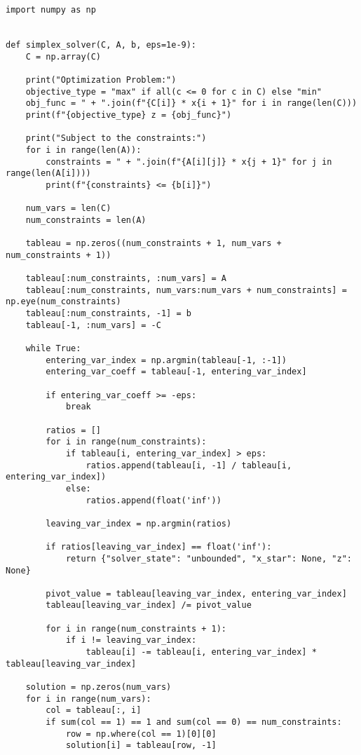 \documentclass[12pt, legalpaper]{exam}
\begin{document}
\begin{verbatim}
import numpy as np


def simplex_solver(C, A, b, eps=1e-9):
    C = np.array(C)

    print("Optimization Problem:")
    objective_type = "max" if all(c <= 0 for c in C) else "min"
    obj_func = " + ".join(f"{C[i]} * x{i + 1}" for i in range(len(C)))
    print(f"{objective_type} z = {obj_func}")

    print("Subject to the constraints:")
    for i in range(len(A)):
        constraints = " + ".join(f"{A[i][j]} * x{j + 1}" for j in range(len(A[i])))
        print(f"{constraints} <= {b[i]}")

    num_vars = len(C)
    num_constraints = len(A)

    tableau = np.zeros((num_constraints + 1, num_vars + num_constraints + 1))

    tableau[:num_constraints, :num_vars] = A
    tableau[:num_constraints, num_vars:num_vars + num_constraints] = np.eye(num_constraints)
    tableau[:num_constraints, -1] = b
    tableau[-1, :num_vars] = -C

    while True:
        entering_var_index = np.argmin(tableau[-1, :-1])
        entering_var_coeff = tableau[-1, entering_var_index]

        if entering_var_coeff >= -eps:
            break

        ratios = []
        for i in range(num_constraints):
            if tableau[i, entering_var_index] > eps:
                ratios.append(tableau[i, -1] / tableau[i, entering_var_index])
            else:
                ratios.append(float('inf'))

        leaving_var_index = np.argmin(ratios)

        if ratios[leaving_var_index] == float('inf'):
            return {"solver_state": "unbounded", "x_star": None, "z": None}

        pivot_value = tableau[leaving_var_index, entering_var_index]
        tableau[leaving_var_index] /= pivot_value

        for i in range(num_constraints + 1):
            if i != leaving_var_index:
                tableau[i] -= tableau[i, entering_var_index] * tableau[leaving_var_index]

    solution = np.zeros(num_vars)
    for i in range(num_vars):
        col = tableau[:, i]
        if sum(col == 1) == 1 and sum(col == 0) == num_constraints:
            row = np.where(col == 1)[0][0]
            solution[i] = tableau[row, -1]


\end{verbatim}
\end{document}
